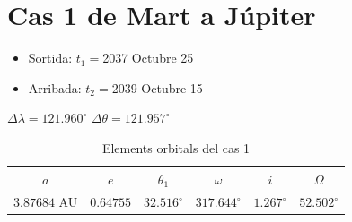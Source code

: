 \section{Cas 1 de Mart a Júpiter}
\begin{itemize}
	\item Sortida: $t_{1}=$2037 Octubre 25
	\item Arribada: $t_{2}=$2039 Octubre 15
\end{itemize}
$\Delta\lambda=121.960^{\circ}$
$\Delta\theta=121.957^{\circ}$
\begin{table}[h!]
	\centering
	\begin{tabular}{ |c|c|c|c|c|c|}
		\hline
		$a$ & $e$ & $\theta_{1}$ & $\omega$ & $i$ & $\Omega$ \\ \hline
		$3.87684$ AU  & $0.64755$ & $32.516^{\circ}$ & $317.644^{\circ}$ & $1.267^{\circ}$ & $52.502^{\circ}$ \\ \hline
	\end{tabular}
	\caption{Elements orbitals del cas 1}
\end{table}

